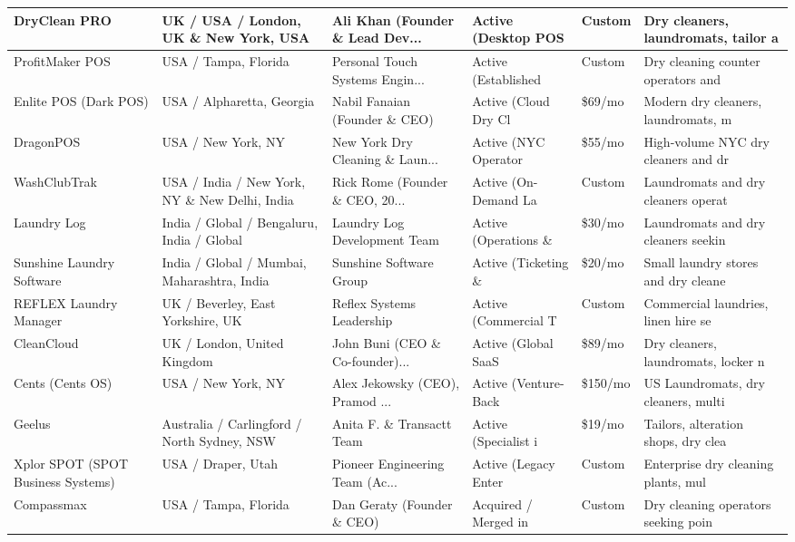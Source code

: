 \documentclass[11pt,a4paper]{article}
\begin{document}
\begin{longtable}{p{3.2cm} p{2.2cm} p{2.5cm} p{2.2cm} p{1.8cm} p{2.5cm}}
\midrule
DryClean PRO & UK / USA / London, UK \& New York, USA & Ali Khan (Founder \& Lead Dev... & Active (Desktop POS  & Custom & Dry cleaners, laundromats, tailor a \\
\midrule
ProfitMaker POS & USA / Tampa, Florida & Personal Touch Systems Engin... & Active (Established  & Custom & Dry cleaning counter operators and  \\
\midrule
Enlite POS (Dark POS) & USA / Alpharetta, Georgia & Nabil Fanaian (Founder \& CEO) & Active (Cloud Dry Cl & \$69/mo & Modern dry cleaners, laundromats, m \\
\midrule
DragonPOS & USA / New York, NY & New York Dry Cleaning \& Laun... & Active (NYC Operator & \$55/mo & High-volume NYC dry cleaners and dr \\
\midrule
WashClubTrak & USA / India / New York, NY \& New Delhi, India & Rick Rome (Founder \& CEO, 20... & Active (On-Demand La & Custom & Laundromats and dry cleaners operat \\
\midrule
Laundry Log & India / Global / Bengaluru, India / Global & Laundry Log Development Team & Active (Operations \& & \$30/mo & Laundromats and dry cleaners seekin \\
\midrule
Sunshine Laundry Software & India / Global / Mumbai, Maharashtra, India & Sunshine Software Group & Active (Ticketing \&  & \$20/mo & Small laundry stores and dry cleane \\
\midrule
REFLEX Laundry Manager & UK / Beverley, East Yorkshire, UK & Reflex Systems Leadership & Active (Commercial T & Custom & Commercial laundries, linen hire se \\
\midrule
CleanCloud & UK / London, United Kingdom & John Buni (CEO \& Co-founder)... & Active (Global SaaS  & \$89/mo & Dry cleaners, laundromats, locker n \\
\midrule
Cents (Cents OS) & USA / New York, NY & Alex Jekowsky (CEO), Pramod ... & Active (Venture-Back & \$150/mo & US Laundromats, dry cleaners, multi \\
\midrule
Geelus & Australia / Carlingford / North Sydney, NSW & Anita F. \& Transactt Team & Active (Specialist i & \$19/mo & Tailors, alteration shops, dry clea \\
\midrule
Xplor SPOT (SPOT Business Systems) & USA / Draper, Utah & Pioneer Engineering Team (Ac... & Active (Legacy Enter & Custom & Enterprise dry cleaning plants, mul \\
\midrule
Compassmax & USA / Tampa, Florida & Dan Geraty (Founder \& CEO) & Acquired / Merged in & Custom & Dry cleaning operators seeking poin \\

\end{longtable}
\end{document}
